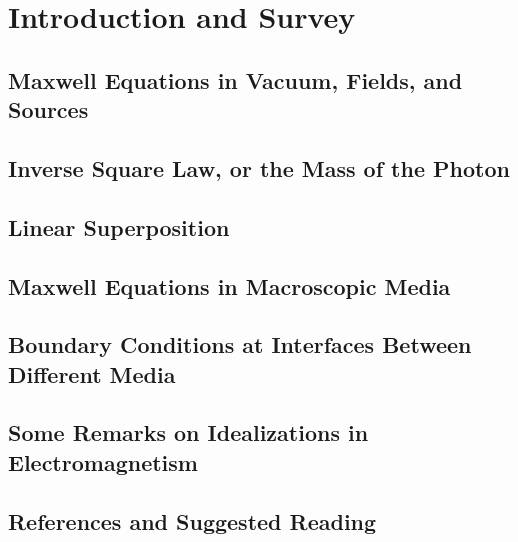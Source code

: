 \renewcommand{\thechapter}{I}
\chapter{Introduction and Survey}
\setcounter{equation}{0}	        %

\section{Maxwell Equations in Vacuum, Fields, and Sources}

\section{Inverse Square Law, or the Mass of the Photon}

\section{Linear Superposition}

\section{Maxwell Equations in Macroscopic Media}

\section{Boundary Conditions at Interfaces Between Different Media}

\section{Some Remarks on Idealizations in Electromagnetism}

\section*{References and Suggested Reading}


